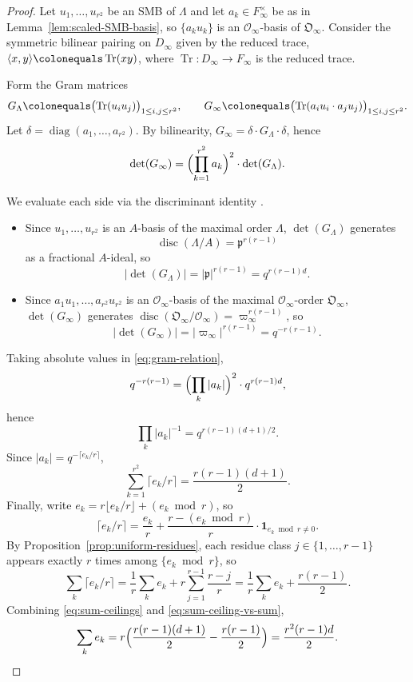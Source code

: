 \documentclass[12pt]{amsart}
\theoremstyle{definition}
\theoremstyle{remark}
\numberwithin{equation}{section}
\numberwithin{thm}{section}
\DeclareMathOperator{\Tr}{Tr}
\DeclareMathOperator{\diag}{diag}
\DeclareMathOperator{\disc}{disc}
\newcommand{\fO}{\mathfrak{O}}
\newcommand{\fp}{\mathfrak{p}}
\newcommand{\cO}{\mathcal{O}}
\newcommand{\Fi}{F_\infty}
\newcommand{\La}{\Lambda}
\newcommand{\abs}[1]{\left|#1\right|}
\begin{document}
	\begin{proof}
		Let $u_1, \ldots, u_{r^2}$ be an SMB of $\La$ and let $a_k \in \Fi^\times$ be as in Lemma~\ref{lem:scaled-SMB-basis}, so $\{a_k u_k\}$ is an $\cO_\infty$-basis of $\fO_\infty$. Consider the symmetric bilinear pairing on $D_\infty$ given by the reduced trace, $\langle x, y\rangle \colonequals \Tr(xy)$, where $\Tr\colon D_\infty \to \Fi$ is the reduced trace.
		
		Form the Gram matrices
		\[
		G_\La \colonequals \bigl(\Tr(u_i u_j)\bigr)_{1\leq i,j\leq r^2}, \qquad G_\infty \colonequals \bigl(\Tr(a_i u_i \cdot a_j u_j)\bigr)_{1\leq i,j\leq r^2}.
		\]
		Let $\delta = \diag(a_1, \ldots, a_{r^2})$. By bilinearity, $G_\infty = \delta\cdot G_\La \cdot \delta$, hence
		\begin{equation}\label{eq:gram-relation}
			\det(G_\infty) = \Bigl(\prod_{k=1}^{r^2} a_k\Bigr)^2 \cdot \det(G_\La).
		\end{equation}
		
		We evaluate each side via the discriminant identity \cite[Thm.~32.1]{Reiner}.
		\begin{itemize}
			\item Since $u_1, \ldots, u_{r^2}$ is an $A$-basis of the maximal order $\La$, $\det(G_\La)$ generates 
			\[\disc(\La/A) = \fp^{r(r-1)}\] as a fractional $A$-ideal, so
			\[
			\abs{\det(G_\La)} = \abs{\fp}^{r(r-1)} = q^{r(r-1)d}.
			\]
			\item Since $a_1 u_1, \ldots, a_{r^2} u_{r^2}$ is an $\cO_\infty$-basis of the maximal $\cO_\infty$-order $\fO_\infty$, $\det(G_\infty)$ generates $\disc(\fO_\infty/\cO_\infty) = \varpi_\infty^{r(r-1)}$, so
			\[
			\abs{\det(G_\infty)} = \abs{\varpi_\infty}^{r(r-1)} = q^{-r(r-1)}.
			\]
		\end{itemize}
		Taking absolute values in \eqref{eq:gram-relation},
		\[
		q^{-r(r-1)} = \Bigl(\prod_k \abs{a_k}\Bigr)^2 \cdot q^{r(r-1)d},
		\]
		hence
		\[
		\prod_k \abs{a_k}^{-1} = q^{r(r-1)(d+1)/2}.
		\]
		Since $\abs{a_k} = q^{-\lceil e_k/r\rceil}$,
		\begin{equation}\label{eq:sum-ceilings}
			\sum_{k=1}^{r^2} \lceil e_k/r\rceil = \frac{r(r-1)(d+1)}{2}.
		\end{equation}
		Finally, write $e_k = r\lfloor e_k/r\rfloor + (e_k \bmod r)$, so
		\[
		\lceil e_k/r\rceil = \frac{e_k}{r} + \frac{r - (e_k \bmod r)}{r}\cdot \mathbf{1}_{e_k \bmod r \neq 0}.
		\]
		By Proposition~\ref{prop:uniform-residues}, each residue class $j \in \{1, \ldots, r-1\}$ appears exactly $r$ times among $\{e_k \bmod r\}$, so
		\begin{equation}\label{eq:sum-ceiling-vs-sum}
			\sum_k \lceil e_k/r\rceil = \frac{1}{r}\sum_k e_k + r\sum_{j=1}^{r-1}\frac{r-j}{r} = \frac{1}{r}\sum_k e_k + \frac{r(r-1)}{2}.
		\end{equation}
		Combining \eqref{eq:sum-ceilings} and \eqref{eq:sum-ceiling-vs-sum},
		\[
		\sum_k e_k = r\Bigl(\frac{r(r-1)(d+1)}{2} - \frac{r(r-1)}{2}\Bigr) = \frac{r^2(r-1)d}{2}. \qedhere
		\]
	\end{proof}
	
\end{document}

